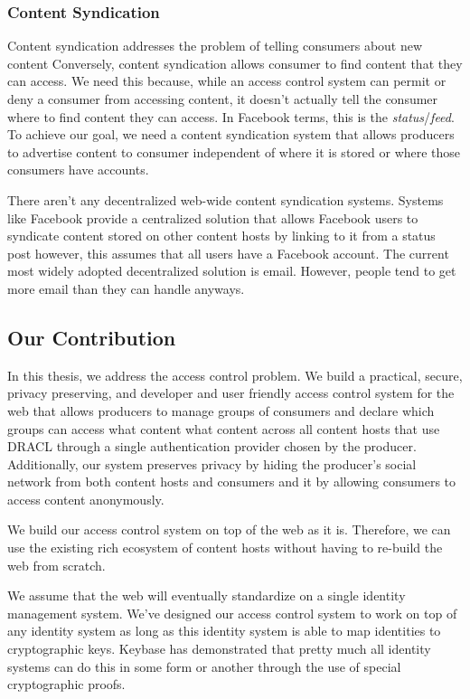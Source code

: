 \documentclass[pdftex,12pt,a4papaer,twoside,notitlepage]{report}
\begin{document}
\subsubsection{Content Syndication}

Content syndication addresses the problem of telling consumers about new content
Conversely, content syndication allows consumer to find content that they can
access. We need this because, while an access control system can permit or deny
a consumer from accessing content, it doesn't actually tell the consumer where
to find content they can access. In Facebook terms, this is the
\emph{status}/\emph{feed}. To achieve our goal, we need a content syndication
system that allows producers to advertise content to consumer independent of
where it is stored or where those consumers have accounts.

There aren't any decentralized web-wide content syndication systems. Systems
like Facebook provide a centralized solution that allows Facebook users to
syndicate content stored on other content hosts by linking to it from a status
post however, this assumes that all users have a Facebook account. The current
most widely adopted decentralized solution is email. However, people tend to get
more email than they can handle anyways.

\subsection{Our Contribution}

In this thesis, we address the access control problem. We build a practical,
secure, privacy preserving, and developer and user friendly access control
system for the web that allows producers to manage groups of consumers and
declare which groups can access what content what content across all content
hosts that use DRACL through a single authentication provider chosen by the
producer. Additionally, our system preserves privacy by hiding the producer's
social network from both content hosts and consumers and it by allowing
consumers to access content anonymously.

We build our access control system on top of the web as it is. Therefore, we can
use the existing rich ecosystem of content hosts without having to re-build the
web from scratch.

We assume that the web will eventually standardize on a single identity
management system. We've designed our access control system to work on top of
any identity system as long as this identity system is able to map identities to
cryptographic keys. Keybase has demonstrated that pretty much all identity
systems can do this in some form or another through the use of special
cryptographic proofs.
\end{document}
